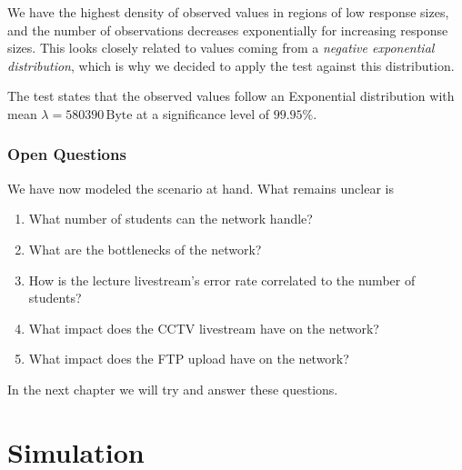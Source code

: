 \documentclass[a4paper]{scrreprt}
\begin{document}
		We have the highest density of observed values in regions of low response sizes, and the number of observations decreases exponentially for increasing response sizes. This looks closely related to values coming from a \emph{negative exponential distribution}, which is why we decided to apply the test against this distribution.
		
		The test states that the observed values follow an Exponential distribution with mean $\lambda=580390\,\text{Byte}$ at a significance level of $99.95\%$.
		
	\subsection{Open Questions}
		We have now modeled the scenario at hand. What remains unclear is
		
		\begin{enumerate}
			\item What number of students can the network handle?
			\item What are the bottlenecks of the network?
			\item How is the lecture livestream's error rate correlated to the number of students?
			\item What impact does the CCTV livestream have on the network?
			\item What impact does the FTP upload have on the network?
		\end{enumerate}
		
		In the next chapter we will try and answer these questions.

\chapter{Simulation}
\end{document}
